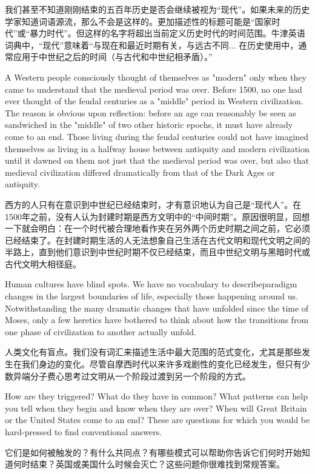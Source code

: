 \begin{paracol}{2}
\switchcolumn
我们甚至不知道刚刚结束的五百年历史是否会继续被视为“现代”。如果未来的历史学家知道词语源流，那么不会是这样的。更加描述性的标题可能是“国家时代”或“暴力时代”。但这样的名字将超出当前定义历史时代的时间范围。牛津英语词典中，“现代”意味着“与现在和最近时期有关，与远古不同... 在历史使用中，通常应用于中世纪之后的时间（与古代和中世纪相矛盾）。”

\switchcolumn*
A Western people consciously thought of themselves as "modern" only when they came to understand that the medieval period was over. Before 1500, no one had ever thought of the feudal centuries as a "middle" period in Western civilization. The reason is obvious upon reflection: before an age can reasonably be seen as sandwiched in the "middle" of two other historic epochs, it must have already come to an end. Those living during the feudal centuries could not have imagined themselves as living in a halfway house between antiquity and modern civilization until it dawned on them not just that the medieval period was over, but also that medieval civilization differed dramatically from that of the Dark Ages or antiquity.

\switchcolumn
西方的人只有在意识到中世纪已经结束时，才有意识地认为自己是“现代人”。在1500年之前，没有人认为封建时期是西方文明中的“中间时期”。原因很明显，回想一下就会明白：在一个时代被合理地看作夹在另外两个历史时期之间之前，它必须已经结束了。在封建时期生活的人无法想象自己生活在古代文明和现代文明之间的半路上，直到他们意识到中世纪时期不仅已经结束，而且中世纪文明与黑暗时代或古代文明大相径庭。

\switchcolumn*
Human cultures have blind spots. We have no vocabulary to describeparadigm changes in the largest boundaries of life, especially those happening around us. Notwithstanding the many dramatic changes that have unfolded since the time of Moses, only a few heretics have bothered to think about how the transitions from one phase of civilization to another actually unfold.

\switchcolumn
人类文化有盲点。我们没有词汇来描述生活中最大范围的范式变化，尤其是那些发生在我们身边的变化。尽管自摩西时代以来许多戏剧性的变化已经发生，但只有少数异端分子费心思考过文明从一个阶段过渡到另一个阶段的方式。

\switchcolumn*
How are they triggered? What do they have in common? What patterns can help you tell when they begin and know when they are over? When will Great Britain or the United States come to an end? These are questions for which you would be hard-pressed to find conventional answers.

\switchcolumn
它们是如何被触发的？有什么共同点？有哪些模式可以帮助你告诉它们何时开始知道何时结束？英国或美国什么时候会灭亡？这些问题你很难找到常规答案。

\end{paracol}


